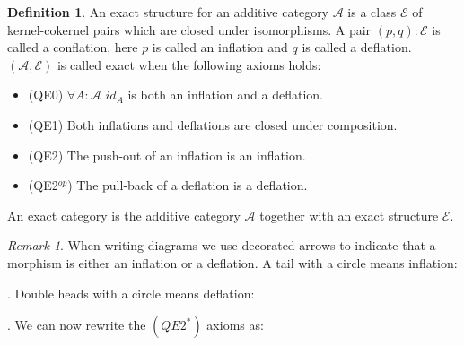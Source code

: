 \documentclass[12pt]{article}
\theoremstyle{definition}
\newtheorem{definition}{Definition}[section]
\theoremstyle{remark}
\newtheorem*{remark}{Remark}
\begin{document}
            \begin{definition}
                An exact structure for an additive category $\mathcal{A}$ is a class $\mathcal{E}$ of kernel-cokernel pairs which are closed under isomorphisms. A pair $(p,q):\mathcal{E}$ is called a conflation, here $p$ is called an inflation and $q$ is called a deflation. $(\mathcal{A},\mathcal{E})$ is called exact when the following axioms holds:
                \begin{itemize}
                    \item (QE0) $\forall A:\mathcal{A}$ $id_A$ is both an inflation and a deflation.
                    \item (QE1) Both inflations and deflations are closed under composition.
                    \item (QE2) The push-out of an inflation is an inflation.
                    \item (QE2$^{op}$) The pull-back of a deflation is a deflation.
                \end{itemize}

                An exact category is the additive category $\mathcal{A}$ together with an exact structure $\mathcal{E}$.
            \end{definition}


            \begin{remark}
                When writing diagrams we use decorated arrows to indicate that a morphism is either an inflation or a deflation. A tail with a circle means inflation: . Double heads with a circle means deflation: . We can now rewrite the $(QE2^*)$ axioms as:
                \begin{center}
                \end{center}
            \end{remark}
\end{document}
